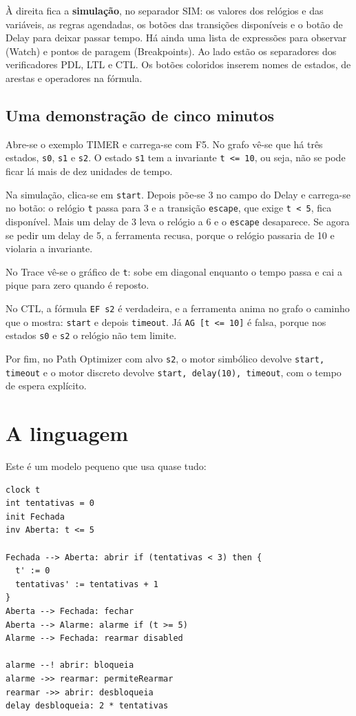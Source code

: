 \documentclass[11pt,a4paper]{article}
\newcommand{\code}[1]{\texttt{#1}}
\begin{document}
À direita fica a \textbf{simulação}, no separador SIM: os valores dos relógios e das variáveis, as regras agendadas, os botões das transições disponíveis e o botão de Delay para deixar passar tempo. Há ainda uma lista de expressões para observar (Watch) e pontos de paragem (Breakpoints). Ao lado estão os separadores dos verificadores PDL, LTL e CTL. Os botões coloridos inserem nomes de estados, de arestas e operadores na fórmula.

\subsection{Uma demonstração de cinco minutos}

Abre-se o exemplo TIMER e carrega-se com F5. No grafo vê-se que há três estados, \code{s0}, \code{s1} e \code{s2}. O estado \code{s1} tem a invariante \code{t <= 10}, ou seja, não se pode ficar lá mais de dez unidades de tempo.

Na simulação, clica-se em \code{start}. Depois põe-se 3 no campo do Delay e carrega-se no botão: o relógio \code{t} passa para 3 e a transição \code{escape}, que exige \code{t < 5}, fica disponível. Mais um delay de 3 leva o relógio a 6 e o \code{escape} desaparece. Se agora se pedir um delay de 5, a ferramenta recusa, porque o relógio passaria de 10 e violaria a invariante.

No Trace vê-se o gráfico de \code{t}: sobe em diagonal enquanto o tempo passa e cai a pique para zero quando é reposto.

No CTL, a fórmula \code{EF s2} é verdadeira, e a ferramenta anima no grafo o caminho que o mostra: \code{start} e depois \code{timeout}. Já \code{AG [t <= 10]} é falsa, porque nos estados \code{s0} e \code{s2} o relógio não tem limite.

Por fim, no Path Optimizer com alvo \code{s2}, o motor simbólico devolve \code{start, timeout} e o motor discreto devolve \code{start, delay(10), timeout}, com o tempo de espera explícito.

\section{A linguagem}

Este é um modelo pequeno que usa quase tudo:

\begin{lstlisting}
clock t
int tentativas = 0
init Fechada
inv Aberta: t <= 5

Fechada --> Aberta: abrir if (tentativas < 3) then {
  t' := 0
  tentativas' := tentativas + 1
}
Aberta --> Fechada: fechar
Aberta --> Alarme: alarme if (t >= 5)
Alarme --> Fechada: rearmar disabled

alarme --! abrir: bloqueia
alarme ->> rearmar: permiteRearmar
rearmar ->> abrir: desbloqueia
delay desbloqueia: 2 * tentativas
\end{lstlisting}
\end{document}
